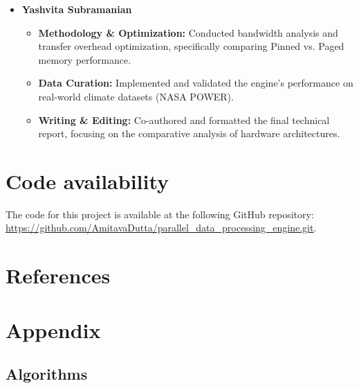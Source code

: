 \begin{itemize}
    \item \textbf{Yashvita Subramanian}
    \begin{itemize}
        \item \textbf{Methodology \& Optimization:} Conducted bandwidth analysis and transfer overhead optimization, specifically comparing Pinned vs. Paged memory performance.
        \item \textbf{Data Curation:} Implemented and validated the engine's performance on real-world climate datasets (NASA POWER).
        \item \textbf{Writing \& Editing:} Co-authored and formatted the final technical report, focusing on the comparative analysis of hardware architectures.
    \end{itemize}
\end{itemize}

\section{Code availability}
The code for this project is available at the following GitHub repository:
\url{https://github.com/AmitavaDutta/parallel_data_processing_engine.git}.

\section{References}



\section{Appendix}

\subsection{Algorithms}

